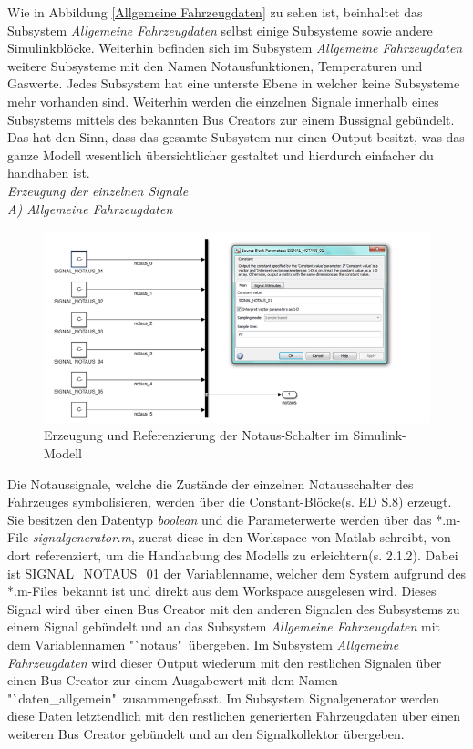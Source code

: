 \documentclass[fontsize = 12pt, paper = a4]{scrreprt}
\begin{document}
\newpage




Wie in Abbildung \ref{Allgemeine Fahrzeugdaten} zu sehen ist, beinhaltet das Subsystem \textit{Allgemeine Fahrzeugdaten} selbst einige Subsysteme sowie andere Simulinkblöcke. Weiterhin befinden sich im Subsystem \textit{Allgemeine Fahrzeugdaten} weitere Subsysteme mit den Namen Notausfunktionen, Temperaturen und Gaswerte. Jedes Subsystem hat eine unterste Ebene in welcher keine Subsysteme mehr vorhanden sind. Weiterhin werden die einzelnen Signale innerhalb eines Subsystems mittels des bekannten Bus Creators zur einem Bussignal gebündelt. Das hat den Sinn, dass das gesamte Subsystem nur einen Output besitzt, was das ganze Modell wesentlich übersichtlicher  gestaltet und hierdurch einfacher du handhaben ist. \\

\textit{Erzeugung der einzelnen Signale } \\

\textit{A) Allgemeine Fahrzeugdaten} \\

\begin{figure}[h]
\centering
\includegraphics[scale = 0.95]{notaus}
\caption[Testsignale der Notaus-Schalter]{Erzeugung und Referenzierung der Notaus-Schalter im Simulink-Modell}
\label{notaus}
\end{figure}

Die Notaussignale, welche die Zustände der einzelnen Notausschalter des Fahrzeuges symbolisieren, werden über die Constant-Blöcke(s. ED S.8) erzeugt. Sie besitzen den Datentyp \textit{boolean} und die Parameterwerte werden über das *.m-File \textit{signalgenerator.m},  zuerst diese in den Workspace von Matlab schreibt, von dort referenziert, um die Handhabung des Modells zu erleichtern(s. 2.1.2). Dabei ist SIGNAL\_NOTAUS\_01 der Variablenname, welcher dem System aufgrund des *.m-Files bekannt ist und  direkt aus dem Workspace  ausgelesen wird. Dieses Signal wird über einen Bus Creator mit den anderen Signalen des Subsystems zu einem Signal gebündelt und an das Subsystem \textit{Allgemeine Fahrzeugdaten} mit dem Variablennamen "`notaus"\ übergeben. Im Subsystem \textit{Allgemeine Fahrzeugdaten} wird dieser Output wiederum mit den restlichen Signalen über einen Bus Creator zur einem Ausgabewert mit dem Namen "`daten\_allgemein"\ zusammengefasst.  Im Subsystem Signalgenerator  werden diese Daten letztendlich mit den restlichen generierten Fahrzeugdaten über einen weiteren Bus Creator gebündelt und an den Signalkollektor übergeben. 
\end{document}
